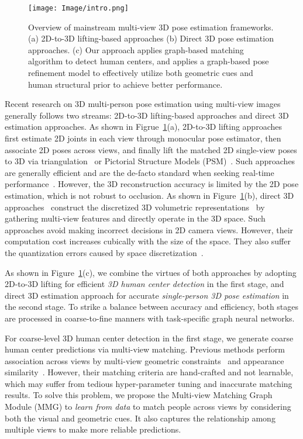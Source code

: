 \documentclass[10pt,twocolumn,letterpaper]{article}
\begin{document}
\begin{figure}[t]
	\centering
	\texttt{[image: Image/intro.png]}
	\caption{Overview of mainstream multi-view 3D pose estimation frameworks. (a) 2D-to-3D lifting-based approaches (b) Direct 3D pose estimation approaches. (c) Our approach applies graph-based matching algorithm to detect human centers, and applies a graph-based pose refinement model to effectively utilize both geometric cues and human structural prior to achieve better performance. }
	\label{fig:framework_compare}
\end{figure}

Recent research on 3D multi-person pose estimation using multi-view images generally follows two streams: 2D-to-3D lifting-based approaches and direct 3D estimation approaches. As shown in Figrue~\ref{fig:framework_compare}(a), 2D-to-3D lifting approaches~\cite{belagiannis20143d, belagiannis20153d} first estimate 2D joints in each view through monocular pose estimator, then associate 2D poses across views, and finally lift the matched 2D single-view poses to 3D via triangulation~\cite{andrew2001multiple} or Pictorial
Structure Models (PSM)~\cite{dong2019fast}. Such approaches are generally efficient and are the de-facto standard when seeking real-time performance~\cite{remelli2020lightweight}. However, the 3D reconstruction accuracy is limited by the 2D pose estimation, which is not robust to occlusion. As shown in Figure~\ref{fig:framework_compare}(b), direct 3D approaches~\cite{tu2020voxelpose} construct the discretized 3D volumetric representations~\cite{pavlakos2018ordinal,pavlakos2017coarse} by gathering multi-view features and directly operate in the 3D space. 
Such approaches avoid making incorrect decisions in 2D camera views. However, their computation cost increases cubically with the size of the space. They also suffer the quantization errors caused by space discretization~\cite{tu2020voxelpose}.

As shown in Figure~\ref{fig:framework_compare}(c), we combine the virtues of both approaches by adopting 2D-to-3D lifting for efficient \emph{3D human center detection} in the first stage, and direct 3D estimation approach for accurate \emph{single-person 3D pose estimation} in the second stage. To strike a balance between accuracy and efficiency, both stages are processed in coarse-to-fine manners with task-specific graph neural networks.


For coarse-level 3D human center detection in the first stage, we 
generate coarse human center predictions via multi-view matching. Previous methods perform association across views by multi-view geometric constraints~\cite{kadkhodamohammadi2021generalizable} and appearance similarity~\cite{dong2019fast}. However, their matching criteria are hand-crafted and not learnable, which may suffer from tedious hyper-parameter tuning and inaccurate matching results. To solve this problem, we propose the Multi-view Matching Graph Module (MMG) to \emph{learn from data} to match people across views by considering both the visual and geometric cues. It also captures the relationship among multiple views to make more reliable predictions. 
\end{document}
